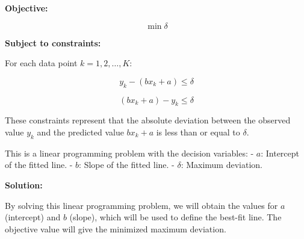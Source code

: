 \documentclass{article}
\begin{document}
\textbf{Objective:}

\[
\min \delta
\]

\textbf{Subject to constraints:}

For each data point \( k = 1, 2, \ldots, K \):

\[
y_k - (bx_k + a) \leq \delta
\]

\[
(bx_k + a) - y_k \leq \delta
\]

These constraints represent that the absolute deviation between the observed value \( y_k \) and the predicted value \( bx_k + a \) is less than or equal to \( \delta \).

This is a linear programming problem with the decision variables:
- \( a \): Intercept of the fitted line.
- \( b \): Slope of the fitted line.
- \( \delta \): Maximum deviation.

\textbf{Solution:}

By solving this linear programming problem, we will obtain the values for \( a \) (intercept) and \( b \) (slope), which will be used to define the best-fit line. The objective value will give the minimized maximum deviation.
\end{document}
